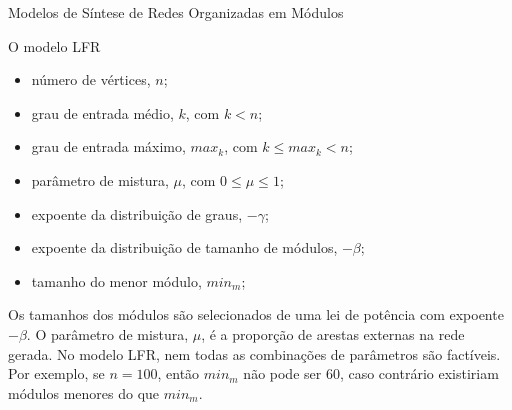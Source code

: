 \begin{section}{Modelos de Síntese de Redes Organizadas em Módulos}
\begin{subsection}{O modelo LFR}
\begin{itemize}
\item número de vértices, $n$;
\item grau de entrada médio, $k$, com $k < n$;
\item grau de entrada máximo, $max_k$, com $k \le max_k < n$;
\item parâmetro de mistura, $\mu$, com $0 \le \mu \le 1$;
\item expoente da distribuição de graus, $-\gamma$;
\item expoente da distribuição de tamanho de módulos, $-\beta$;
\item tamanho do menor módulo, $min_m$;
\end{itemize}

Os tamanhos dos módulos são selecionados de uma lei de potência com expoente $-\beta$. O parâmetro de mistura, $\mu$, é a proporção de arestas externas na rede gerada. No modelo LFR, nem todas as combinações de parâmetros são factíveis. Por exemplo, se $n = 100$, então $min_m$ não pode ser 60, caso contrário existiriam módulos menores do que $min_m$.

\end{subsection}

\end{section}